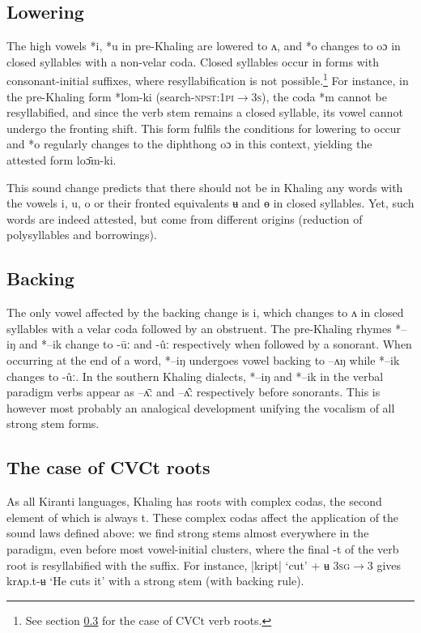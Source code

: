 \documentclass[oldfontcommands,oneside,a4paper,11pt]{article}
\newcommand{\ipa}[1]{{\phon \mbox{#1}}} %
\begin{document}
\subsection{Lowering} \label{sec:lowering}
The high vowels \ipa{*i}, \ipa{*u}   in pre-Khaling are lowered to \ipa{ʌ},  and   \ipa{*o} changes to \ipa{oɔ} in closed syllables with a non-velar coda. Closed syllables occur in forms with consonant-initial suffixes, where resyllabification is not possible.\footnote{See section \ref{sec:cvct} for the case of CVCt verb roots.} For instance, in the pre-Khaling form \ipa{*lom-ki} (search-\textsc{npst:1pi$\rightarrow$3s}), the coda \ipa{*m} cannot be resyllabified, and since the verb stem remains a closed syllable, its vowel cannot undergo the fronting shift. This form fulfils the conditions for  lowering to occur and \ipa{*o} regularly changes to the diphthong \ipa{oɔ} in this context, yielding the attested form \ipa{loɔ̄m-ki}.


This sound change predicts that there should not be in Khaling any words with the vowels \ipa{i}, \ipa{u}, \ipa{o} or their fronted equivalents \ipa{ʉ} and \ipa{ɵ} in closed syllables. Yet, such words are indeed attested, but come from different origins (reduction of polysyllables and borrowings).

\subsection{Backing} \label{sec:backing}
The only vowel affected by the backing change is \ipa{i}, which changes to \ipa{ʌ} in closed syllables with a velar coda followed by an obstruent. The pre-Khaling rhymes \ipa{*--iŋ} and \ipa{*--ik}  change to \ipa{-ūː} and \ipa{-ûː} respectively when followed by a sonorant. When occurring at the end of a word, \ipa{*--iŋ} undergoes vowel backing to \ipa{--ʌŋ} while \ipa{*--ik}  changes to \ipa{-ûː}. In the southern Khaling dialects,  \ipa{*--iŋ} and \ipa{*--ik} in the verbal paradigm verbs appear as \ipa{--ʌ̄ː} and  \ipa{--ʌ̂ː} respectively before sonorants. This is however most probably an analogical development unifying the vocalism of all strong stem forms.


\subsection{The case of CVCt roots} \label{sec:cvct}
As all Kiranti languages, Khaling has roots with complex codas, the second element of which is always \ipa{t}. These complex codas affect the application of the sound laws defined above: we find strong stems almost everywhere in the paradigm, even before most vowel-initial clusters, where the final \ipa{-t} of the verb root is resyllabified with the suffix. For instance,  |\ipa{kript}| `cut' + \ipa{ʉ} \textsc{3sg$\rightarrow$3} gives \ipa{krʌp.t-ʉ} `He cuts it' with a strong stem (with backing rule).
\end{document}
